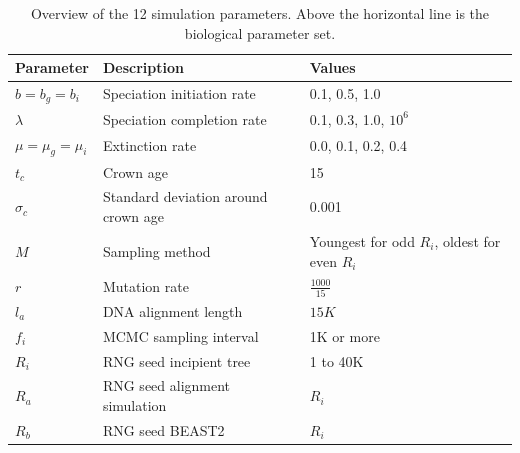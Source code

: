 \documentclass{article}
\begin{document}
\begin{table}
  \centering 
  \begin{tabular}{l l l}
    \hline
    Parameter             & Description & Values \\
    \hline
    \hline
    $b = b_g = b_i$       & Speciation initiation rate & 0.1, 0.5, 1.0 \\
    $\lambda$             & Speciation completion rate & 0.1, 0.3, 1.0, $10^6$ \\
    $\mu = \mu_g = \mu_i$ & Extinction rate & 0.0, 0.1, 0.2, 0.4 \\
    \hline
    $t_c$                 & Crown age & 15 \\
    $\sigma_c$            & Standard deviation around crown age & 0.001 \\
    $M$                   & Sampling method & Youngest for odd $R_i$, oldest for even $R_i$ \\
    $r$                   & Mutation rate & $\frac{1000}{15}$ \\
    $l_a$                 & DNA alignment length & $15K$ \\
    $f_i$                 & MCMC sampling interval & 1K or more \\
    $R_i$                 & RNG seed incipient tree & 1 to 40K \\
    $R_a$                 & RNG seed alignment simulation & $R_i$ \\
    $R_b$                 & RNG seed BEAST2 & $R_i$ \\
    \hline
  \end{tabular}
  \caption{
    Overview of the 12 simulation parameters. Above the horizontal line is 
    the biological parameter set.
  }
  \label{table:simulation_parameters}
\end{table}
\end{document}
